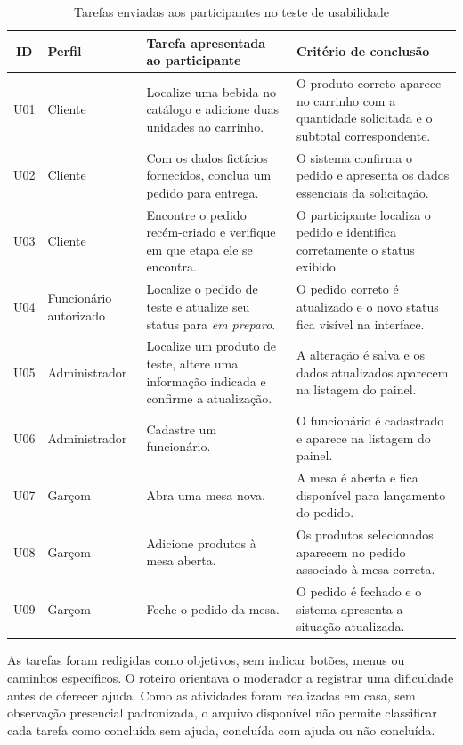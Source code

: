 \begin{table}[htbp]
\centering
\caption{Tarefas enviadas aos participantes no teste de usabilidade}
\label{tab:tarefas-usabilidade}
\footnotesize
\begin{tabularx}{\textwidth}{c p{2.5cm} X X}
\hline
\textbf{ID} & \textbf{Perfil} & \textbf{Tarefa apresentada ao participante} & \textbf{Critério de conclusão} \\
\hline
U01 & Cliente & Localize uma bebida no catálogo e adicione duas unidades ao carrinho. & O produto correto aparece no carrinho com a quantidade solicitada e o subtotal correspondente. \\
\hline
U02 & Cliente & Com os dados fictícios fornecidos, conclua um pedido para entrega. & O sistema confirma o pedido e apresenta os dados essenciais da solicitação. \\
\hline
U03 & Cliente & Encontre o pedido recém-criado e verifique em que etapa ele se encontra. & O participante localiza o pedido e identifica corretamente o status exibido. \\
\hline
U04 & Funcionário autorizado & Localize o pedido de teste e atualize seu status para \textit{em preparo}. & O pedido correto é atualizado e o novo status fica visível na interface. \\
\hline
U05 & Administrador & Localize um produto de teste, altere uma informação indicada e confirme a atualização. & A alteração é salva e os dados atualizados aparecem na listagem do painel. \\
\hline
U06 & Administrador & Cadastre um funcionário. & O funcionário é cadastrado e aparece na listagem do painel. \\
\hline
U07 & Garçom & Abra uma mesa nova. & A mesa é aberta e fica disponível para lançamento do pedido. \\
\hline
U08 & Garçom & Adicione produtos à mesa aberta. & Os produtos selecionados aparecem no pedido associado à mesa correta. \\
\hline
U09 & Garçom & Feche o pedido da mesa. & O pedido é fechado e o sistema apresenta a situação atualizada. \\
\hline
\end{tabularx}
\end{table}

As tarefas foram redigidas como objetivos, sem indicar botões, menus ou caminhos específicos. O roteiro orientava o moderador a registrar uma dificuldade antes de oferecer ajuda. Como as atividades foram realizadas em casa, sem observação presencial padronizada, o arquivo disponível não permite classificar cada tarefa como concluída sem ajuda, concluída com ajuda ou não concluída.

